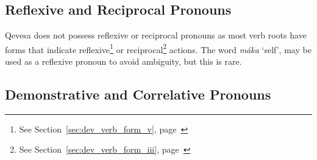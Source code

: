 \documentclass[grammar]{subfiles}
\begin{document}
	\newpage
	\subsection{Reflexive and Reciprocal Pronouns}
	\label{ssec:nm_reflexive_pronouns}

	Qevesa does not possess reflexive or reciprocal pronouns as most verb roots have forms that indicate reflexive\footnote{See  Section~\ref{sec:dev_verb_form_v}, page~\pageref{sec:dev_verb_form_v}} or reciprocal\footnote{See  Section~\ref{sec:dev_verb_form_iii}, page~\pageref{sec:dev_verb_form_iii}} actions. The word \textit{máka} ‘self’, may be used as a reflexive pronoun to avoid ambiguity, but this is rare.



	\subsection{Demonstrative and Correlative Pronouns}
	\label{ssec:nm_demonstrative_pronouns}
\end{document}

